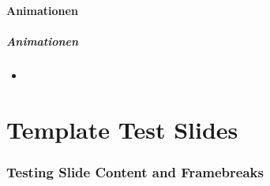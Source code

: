 \documentclass[german,aspectratio=169,notoc,titlestyle=tud,draft]{tudbeamer}%
\begin{document}
\subsection{Animationen}
\begin{frame}
	\frametitle{Animationen}

	\begin{itemize}
		\item 
	\end{itemize}

\end{frame}

\part{Template Test Slides}
\section[Content and Framebreaks]{Testing Slide Content and Framebreaks}	
\end{document}
